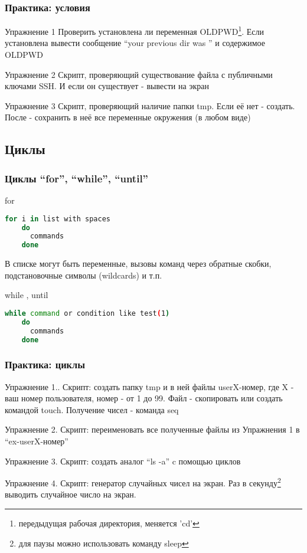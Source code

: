 \begin{frame}[fragile]
  \frametitle{Практика: условия}

  \alert{Упражнение 1} Проверить установлена ли переменная OLDPWD\footnote{передыдущая рабочая директория, меняется 'cd'}. Если установлена вывести сообщение ``your previous dir was '' и содержимое OLDPWD \pause

  \alert{Упражнение 2} Скрипт, проверяющий существование файла с публичными ключами SSH. И если он существует - вывести на экран  \pause

  \alert{Упражнение 3} Скрипт, проверяющий наличие папки tmp. Если её нет - создать. После - сохранить в неё все переменные окружения (в любом виде)
\end{frame}

\subsection{Циклы}

\begin{frame}[fragile]
  \frametitle{Циклы ``for'', ``while'', ``until''}
      \alert{for}
      \begin{lstlisting}[language=sh,frame=single,basicstyle=\normalsize,breaklines=true]
	for i in list with spaces
	do
	  commands
	done
      \end{lstlisting}
      В списке могут быть переменные, вызовы команд через обратные скобки, подстановочные символы (wildcards) и т.п.\pause
  
      \alert{while , until}
      \begin{lstlisting}[language=sh,frame=single,basicstyle=\normalsize,breaklines=true]
	while command or condition like test(1)
	do
	  commands
	done
      \end{lstlisting} 
\end{frame}

\begin{frame}
  \frametitle{Практика: циклы}

    \alert{Упражнение 1.}. Скрипт: создать папку tmp и в ней файлы userX-номер, где X - ваш номер пользователя, номер - от 1 до 99. Файл - скопировать или создать командой touch. Получение чисел - команда seq \pause

    \alert{Упражнение 2.} Скрипт: переименовать все полученные файлы из Упражнения 1 в ``ex-userX-номер'' \pause

    \alert{Упражнение 3.} Скрипт: создать аналог ``ls -a'' c помощью циклов \pause

    \alert{Упражнение 4.} Скрипт: генератор случайных чисел на экран. Раз в секунду\footnote{для паузы можно использовать команду sleep} выводить случайное число на экран.
\end{frame}

